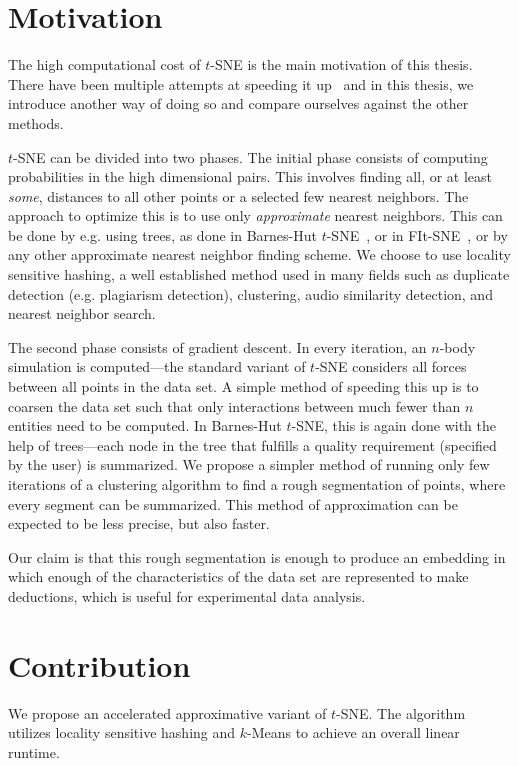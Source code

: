 \section{Motivation}

The high computational cost of $t$-SNE is the main motivation of this thesis.
There have been multiple attempts at speeding it up~\cite{bhtsne,fitsne,umap,largevis}
and in this thesis, we introduce another way of doing so and compare ourselves
against the other methods.

$t$-SNE can be divided into two phases. The initial phase consists of computing
probabilities in the high dimensional pairs. This involves finding all, or at
least \emph{some}, distances to all other points or a selected few nearest
neighbors. The approach to optimize this is to use only \emph{approximate}
nearest neighbors. This can be done by e.g. using trees, as done in Barnes-Hut
$t$-SNE~\cite{bhtsne}, or in FIt-SNE~\cite{fitsne}, or by any other approximate
nearest neighbor finding scheme. We choose to use locality sensitive hashing, a
well established method used in many fields such as duplicate detection (e.g.
plagiarism detection), clustering, audio similarity detection, and nearest
neighbor search.

The second phase consists of gradient descent. In every iteration, an $n$-body
simulation is computed---the standard variant of $t$-SNE considers all forces
between all points in the data set. A simple method of speeding this up is to
coarsen the data set such that only interactions between much fewer than $n$
entities need to be computed. In Barnes-Hut $t$-SNE, this is again done with
the help of trees---each node in the tree that fulfills a quality requirement
(specified by the user) is summarized. We propose a simpler method of running
only few iterations of a clustering algorithm to find a rough segmentation of
points, where every segment can be summarized. This method of approximation can
be expected to be less precise, but also faster.

Our claim is that this rough segmentation is enough to produce an embedding in
which enough of the characteristics of the data set are represented to make
deductions, which is useful for experimental data analysis.

\section{Contribution}

We propose an accelerated approximative variant of $t$-SNE. The
algorithm utilizes locality sensitive hashing and $k$-Means to achieve
an overall linear runtime.


